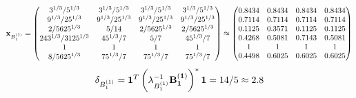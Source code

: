 \documentclass[10pt,a4paper]{article}
\begin{document}
	\[
		\bold{x}_{B_1^{(1)}} = 
		\begin{pmatrix}
			{{3^ {1 / 3}}} / {{5^ {1 / 3}}} & {{3^ {1 / 3}}} / {{5^ {1 / 3}}} & {{3^ {1 / 3}}} / {{5^ {1 / 3}}} & {{3^ {1 / 3}}} / {{5^ {1 / 3}}} \\
			{{9^ {1 / 3}}} / {{25^ {1 / 3}}} & {{9^ {1 / 3}}} / {{25^ {1 / 3}}} & {{9^ {1 / 3}}} / {{25^ {1 / 3}}} & {{9^ {1 / 3}}} / {{25^ {1 / 3}}} \\
			{{2}} / {{5625^ {1 / 3}}} & {{5}} / {{14}} & {{2}} / {{5625^ {1 / 3}}} & {{2}} / {{5625^ {1 / 3}}} \\
			{{243^ {1 / 3}}} / {{3125^ {1 / 3}}} & {{45^ {1 / 3}}} / {{7}} & {{5}} / {{7}} & {{45^ {1 / 3}}} / {{7}} \\
			{1}{} & {1}{} & {1}{} & {1}{} \\
			{{8}} / {{5625^ {1 / 3}}} & {{75^ {1 / 3}}} / {{7}} & {{75^ {1 / 3}}} / {{7}} & {{75^ {1 / 3}}} / {{7}} \\
		\end{pmatrix}
		\approx
		\begin{pmatrix}
			0.8434   & 0.8434   & 0.8434   & 0.8434   \\
			0.7114   & 0.7114   & 0.7114   & 0.7114   \\
			0.1125   & 0.3571   & 0.1125   & 0.1125   \\
			0.4268   & 0.5081   & 0.7143   & 0.5081   \\
			1        & 1        & 1        & 1        \\
			0.4498   & 0.6025   & 0.6025   & 0.6025   \\
		\end{pmatrix}
	\]
	\[
		\delta_{B_1^{(1)}} = \bold{1}^T \left(\lambda_{B_1^{(1)}}^{-1}\bold{B_1^{(1)}}\right)^* \bold{1} = {{14}} / {{5}}\approx 2.8
	\]
\end{document}
